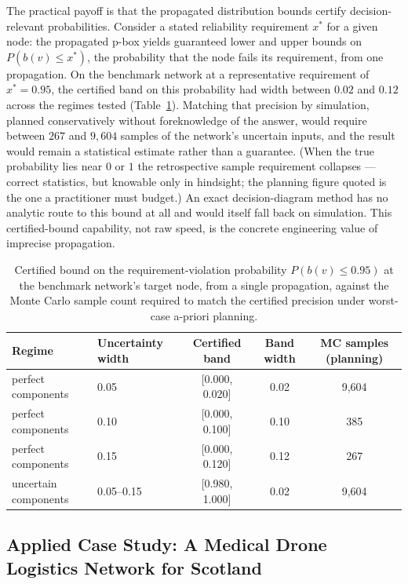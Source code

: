 \documentclass[preprint,12pt]{elsarticle}
\theoremstyle{definition}
\begin{document}
The practical payoff is that the propagated distribution bounds certify decision-relevant probabilities.
Consider a stated reliability requirement $x^\ast$ for a given node: the propagated p-box yields
guaranteed lower and upper bounds on $P(b(v)\le x^\ast)$, the probability that the node fails its
requirement, from one propagation. On the benchmark network at a representative requirement of
$x^\ast=0.95$, the certified band on this probability had width between $0.02$ and $0.12$ across the
regimes tested (Table~\ref{tab:certified}). Matching that precision by simulation, planned conservatively
without foreknowledge of the answer, would require between $267$ and $9{,}604$ samples of the network's
uncertain inputs, and the result would remain a statistical estimate rather than a guarantee. (When the
true probability lies near $0$ or $1$ the retrospective sample requirement collapses --- correct
statistics, but knowable only in hindsight; the planning figure quoted is the one a practitioner must
budget.) An exact decision-diagram method has no analytic route to this bound at all and would itself
fall back on simulation. This certified-bound capability, not raw speed, is the concrete engineering
value of imprecise propagation.

\begin{table}[t]
\centering\small
\caption{Certified bound on the requirement-violation probability $P(b(v)\le 0.95)$ at the benchmark
network's target node, from a single propagation, against the Monte Carlo sample count required to match
the certified precision under worst-case a-priori planning.}
\label{tab:certified}
\begin{tabular}{llccc}
\toprule
Regime & Uncertainty width & Certified band & Band width & MC samples (planning)\\
\midrule
perfect components & 0.05 & [0.000, 0.020] & 0.02 & 9{,}604\\
perfect components & 0.10 & [0.000, 0.100] & 0.10 & 385\\
perfect components & 0.15 & [0.000, 0.120] & 0.12 & 267\\
uncertain components & 0.05--0.15 & [0.980, 1.000] & 0.02 & 9{,}604\\
\bottomrule
\end{tabular}
\end{table}

\subsection{Applied Case Study: A Medical Drone Logistics Network for Scotland}\label{sec:drone}
\end{document}
